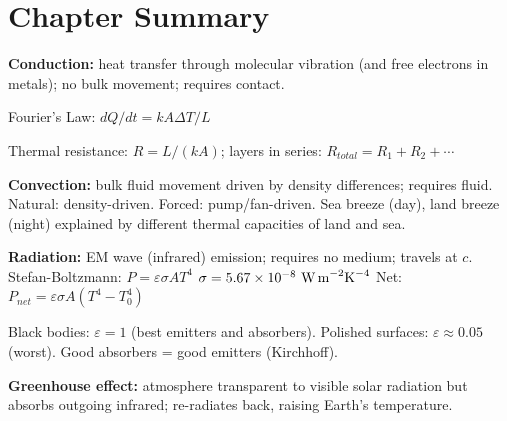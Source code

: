 \section{Chapter Summary}

\begin{summarybox}
\textbf{Conduction:} heat transfer through molecular
vibration (and free electrons in metals); no bulk
movement; requires contact.

Fourier's Law: $dQ/dt = kA\Delta T/L$

Thermal resistance: $R = L/(kA)$; layers in series:
$R_{total} = R_1 + R_2 + \cdots$

\textbf{Convection:} bulk fluid movement driven by
density differences; requires fluid.
Natural: density-driven. Forced: pump/fan-driven.
Sea breeze (day), land breeze (night) explained by
different thermal capacities of land and sea.

\textbf{Radiation:} EM wave (infrared) emission;
requires no medium; travels at $c$.
Stefan-Boltzmann: $P = \varepsilon\sigma AT^4$
$\sigma = 5.67\times10^{-8}\ \text{W\,m}^{-2}\text{K}^{-4}$
Net: $P_{net} = \varepsilon\sigma A(T^4 - T_0^4)$

Black bodies: $\varepsilon = 1$ (best emitters and
absorbers). Polished surfaces: $\varepsilon \approx 0.05$
(worst). Good absorbers = good emitters (Kirchhoff).

\textbf{Greenhouse effect:} atmosphere transparent
to visible solar radiation but absorbs outgoing
infrared; re-radiates back, raising Earth's temperature.
\end{summarybox}

